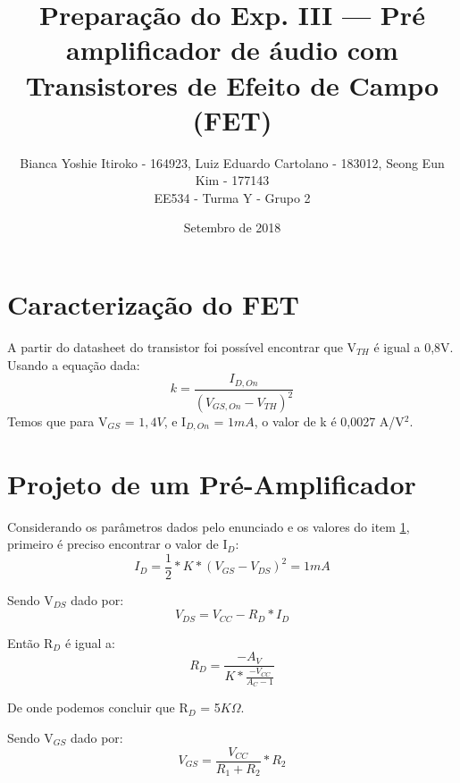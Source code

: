 \documentclass{article}
\begin{document}
\title{Preparação do Exp. III — Pré amplificador de áudio com Transistores de Efeito de Campo (FET)}
\author{Bianca Yoshie Itiroko - 164923, Luiz Eduardo Cartolano - 183012, Seong Eun Kim - 177143 \\ EE534 - Turma Y - Grupo 2}
\date{Setembro de 2018}

\maketitle

\section{Caracterização do FET} \label{sec:1}
A partir do datasheet\cite{ref:datasheet} do transistor foi possível encontrar que V$_{TH}$ é igual a 0,8V. Usando a equação dada:
\begin{equation}
    k = \frac{I_{D,On}}{(V_{GS,On} - V_{TH})^2}
    \label{eq:k}
\end{equation}
Temos que para V$_{GS}$ = $1,4V$, e I$_{D,On}$ = $1mA$, o valor de k é 0,0027 A/V$^2$.

\section{Projeto de um Pré-Amplificador}
Considerando os parâmetros dados pelo enunciado \cite{ref:roteiro} e os valores do item \ref{sec:1}, primeiro é preciso encontrar o valor de I$_D$:
\begin{equation}
    I_D = \frac{1}{2} * K * (V_{GS} - V_{DS})^2 = 1mA
\end{equation}

Sendo V$_{DS}$ dado por:
\begin{equation}
    V_{DS} = V_{CC} - R_D * I_D    
\end{equation}
\newline

Então R$_D$ é igual a:
\begin{equation}
    R_D = \frac{-A_V}{K*\frac{-V_{CC}}{A_C - 1}}
\end{equation}
\newline

De onde podemos concluir que R$_D$ = 5$K\Omega$.
\newline

Sendo V$_{GS}$ dado por:
\begin{equation}
    V_{GS} = \frac{V_{CC}}{R_1 + R_2} * R_2
\end{equation}
\end{document}
